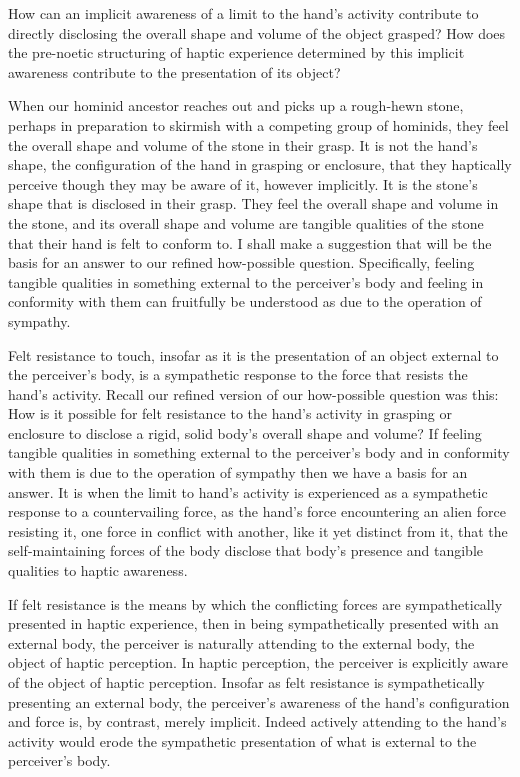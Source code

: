 How can an implicit awareness of a limit to the hand's activity contribute to directly disclosing the overall shape and volume of the object grasped? How does the pre-noetic structuring of haptic experience determined by this implicit awareness contribute to the presentation of its object? 

When our hominid ancestor reaches out and picks up a rough-hewn stone, perhaps in preparation to skirmish with a competing group of hominids, they feel the overall shape and volume of the stone in their grasp. It is not the hand's shape, the configuration of the hand in grasping or enclosure, that they haptically perceive though they may be aware of it, however implicitly. It is the stone's shape that is disclosed in their grasp. They feel the overall shape and volume in the stone, and its overall shape and volume are tangible qualities of the stone that their hand is felt to conform to. I shall make a suggestion that will be the basis for an answer to our refined how-possible question. Specifically, feeling tangible qualities in something external to the perceiver's body and feeling in conformity with them can fruitfully be understood as due to the operation of sympathy. 

Felt resistance to touch, insofar as it is the presentation of an object external to the perceiver's body, is a sympathetic response to the force that resists the hand's activity. Recall our refined version of our how-possible question was this: How is it possible for felt resistance to the hand's activity in grasping or enclosure to disclose a rigid, solid body's overall shape and volume? If feeling tangible qualities in something external to the perceiver's body and in conformity with them is due to the operation of sympathy then we have a basis for an answer. It is when the limit to hand's activity is experienced as a sympathetic response to a countervailing force, as the hand's force encountering an alien force resisting it, one force in conflict with another, like it yet distinct from it, that the self-maintaining forces of the body disclose that body's presence and tangible qualities to haptic awareness.

If felt resistance is the means by which the conflicting forces are sympathetically presented in haptic experience, then in being sympathetically presented with an external body, the perceiver is naturally attending to the external body, the object of haptic perception. In haptic perception, the perceiver is explicitly aware of the object of haptic perception. Insofar as felt resistance is sympathetically presenting an external body, the perceiver's awareness of the hand's configuration and force is, by contrast, merely implicit. Indeed actively attending to the hand's activity would erode the sympathetic presentation of what is external to the perceiver's body. 

